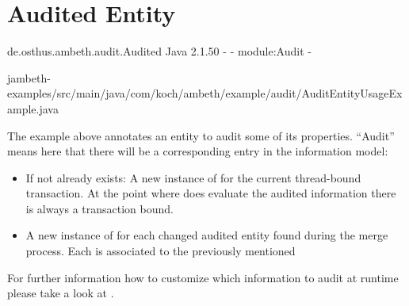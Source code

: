 \section{Audited Entity}
\label{feature:AuditedEntity}
\ClearAPI
\TODO
\feature
	{de.osthus.ambeth.audit.Audited}
	{Java}
	{2.1.50}
	{-}
	{-}
	{module:Audit}
	{-}

	{jambeth-examples/src/main/java/com/koch/ambeth/example/audit/AuditEntityUsageExample.java}

The example above annotates an entity to audit some of its properties. ``Audit'' means here that there will be a corresponding entry in the information model:

\begin{itemize}
	\item If not already exists: A new instance of  for the current thread-bound transaction. At the point where  does evaluate the audited information there is always a transaction bound.
	\item A new instance of  for each changed audited entity found during the merge process. Each  is associated to the previously mentioned 
\end{itemize}

For further information how to customize which information to audit at runtime please take a look at .


 